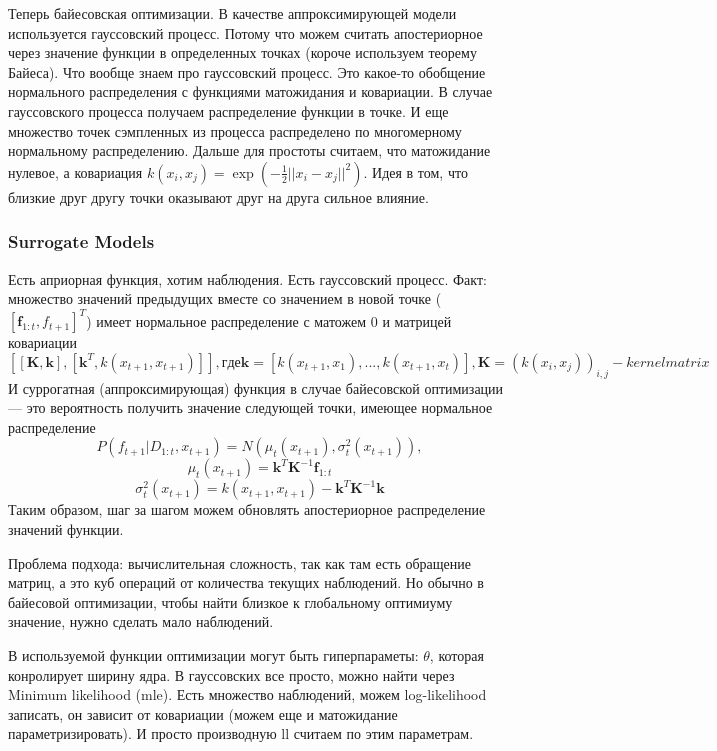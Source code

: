 \documentclass[12pt]{article}
\begin{document}
Теперь байесовская оптимизации. В качестве аппроксимирующей модели используется гауссовский процесс. Потому что можем считать апостериорное через значение функции в определенных точках (короче используем теорему Байеса). Что вообще знаем про гауссовский процесс. Это какое-то обобщение нормального распределения с функциями матожидания и ковариации. В случае гауссовского процесса получаем распределение функции в точке. И еще множество точек сэмпленных из процесса распределено по многомерному нормальному распределению. Дальше для простоты считаем, что матожидание нулевое, а ковариация $k(x_i, x_j) = \exp(-\frac{1}{2}||x_i - x_j||^2)$. Идея в том, что близкие друг другу точки оказывают друг на друга сильное влияние.

\subsubsection{Surrogate Models}
Есть априорная функция, хотим наблюдения. Есть гауссовский процесс. Факт: множество значений предыдущих вместе со значением в новой точке ($[\textbf{f}_{1:t}, f_{t+1}]^T$) имеет нормальное распределение с матожем 0 и матрицей ковариации
$$[[\textbf{K}, \textbf{k}], [\textbf{k}^T, k(x_{t+1}, x_{t+1})]], где \textbf{k}=[k(x_{t+1}, x_1), ..., k(x_{t+1}, x_t)], \textbf{K}=(k(x_i, x_j))_{i,j} - kernel matrix$$
И суррогатная (аппроксимирующая) функция в случае байесовской оптимизации --- это вероятность получить значение следующей точки, имеющее нормальное распределение $$P(f_{t+1}|D_{1:t}, x_{t+1}) = \textit{N}(\mu_t(x_{t+1}), \sigma_t^2(x_{t+1})),$$
$$\mu_t(x_{t+1}) = \textbf{k}^T\textbf{K}^{-1}\textbf{f}_{1:t}$$
$$\sigma_t^2(x_{t+1}) = k(x_{t+1}, x_{t+1}) - \textbf{k}^T\textbf{K}^{-1}\textbf{k}$$
Таким образом, шаг за шагом можем обновлять апостериорное распределение значений функции.

Проблема подхода: вычислительная сложность, так как там есть обращение матриц, а это куб операций от количества текущих наблюдений. Но обычно в байесовой оптимизации, чтобы найти близкое к глобальному оптимиуму значение, нужно сделать мало наблюдений. 
    
В используемой функции оптимизации могут быть гиперпараметы: $\theta$, которая конролирует ширину ядра. В гауссовских все просто, можно найти через Minimum likelihood (mle). Есть множество наблюдений, можем log-likelihood записать, он зависит от ковариации (можем еще и матожидание параметризировать). И просто производную ll считаем по этим параметрам.
\end{document}
